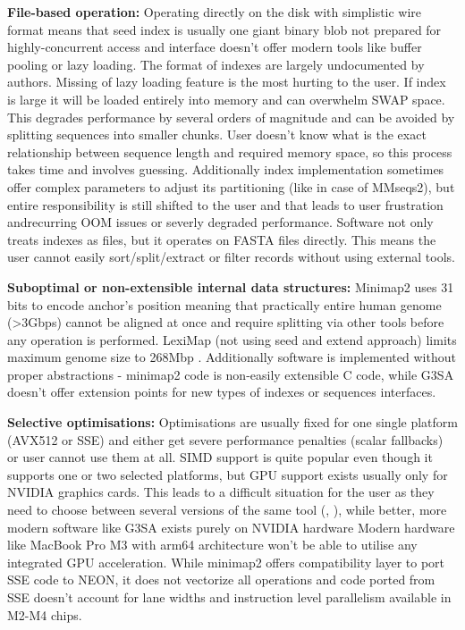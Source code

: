 \textbf{File-based operation:}
Operating directly on the disk with simplistic wire format means that seed index is usually one giant binary blob not prepared for highly-concurrent access and interface doesn't offer modern tools like buffer pooling or lazy loading. The format of indexes are largely undocumented by authors. 
Missing of lazy loading feature is the most hurting to the user.
If index is large it will be loaded entirely into memory and can overwhelm SWAP space. This degrades performance by several orders of magnitude and can be avoided by splitting sequences into smaller chunks. User doesn't know what is the exact relationship between sequence length and required memory space, so 
this process takes time and involves guessing. Additionally index implementation sometimes offer complex parameters to adjust its partitioning (like in case of MMseqs2), but entire responsibility is still shifted to the user and that leads to user frustration andrecurring OOM issues or severly degraded performance. \cite{mmseqs2_issue_338} \cite{mmseqs2_issue_517}
Software not only treats indexes as files, but it operates on FASTA files directly. This means the user cannot easily sort/split/extract or filter records without using external tools.

\textbf{Suboptimal or non-extensible internal data structures:}
Minimap2 uses 31 bits to encode anchor's position meaning that practically entire human genome (>3Gbps) cannot be aligned at once and require splitting via other tools before any operation is performed.
LexiMap (not using seed and extend approach) limits maximum genome size to 268Mbp \cite{lexicmap_faqs}.
Additionally software is implemented without proper abstractions - minimap2 code is non-easily extensible C code, while G3SA doesn't offer extension points for new types of indexes or sequences interfaces.

\textbf{Selective optimisations:}
Optimisations are usually fixed for one single platform (AVX512 or SSE) and either get severe performance penalties (scalar fallbacks) or user cannot use them at all. SIMD support is quite popular even though it supports one or two selected platforms, but GPU support exists usually only for NVIDIA graphics cards.
This leads to a difficult situation for the user as they need to choose between several versions of the same tool (\cite{mm2_fast_paper}, \cite{mm2_gpu_paper}), while better, more modern software like G3SA exists purely on NVIDIA hardware \cite{g3sa_paper}
Modern hardware like MacBook Pro M3 with arm64 architecture won't be able to utilise any integrated GPU acceleration. While minimap2 offers compatibility layer to port SSE code to NEON, it does not vectorize all operations and code ported from SSE doesn't account for lane widths and instruction level parallelism available in M2-M4 chips. \cite{simd_opt_website_jake}

